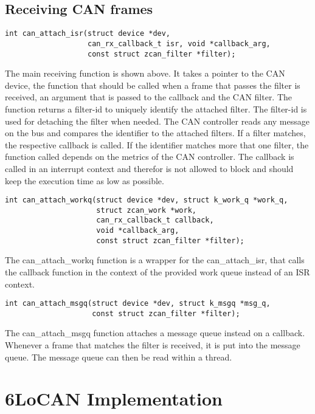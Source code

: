 \subsection{Receiving CAN frames}

\begin{lstlisting}[style=ccode, numbers=none]
int can_attach_isr(struct device *dev,
                   can_rx_callback_t isr, void *callback_arg,
                   const struct zcan_filter *filter);
\end{lstlisting}
The main receiving function is shown above.
It takes a pointer to the CAN device, the function that should be called when a frame that passes the filter is received,
an argument that is passed to the callback and the CAN filter.
The function returns a filter-id to uniquely identify the attached filter.
The filter-id is used for detaching the filter when needed.
The CAN controller reads any message on the bus and compares the identifier to the attached filters.
If a filter matches, the respective callback is called.
If the identifier matches more that one filter, the function called depends on the metrics of the CAN controller.
The callback is called in an interrupt context and therefor is not allowed to block and should keep the execution time as low as possible.

\begin{lstlisting}[style=ccode, numbers=none]
int can_attach_workq(struct device *dev, struct k_work_q *work_q,
                     struct zcan_work *work,
                     can_rx_callback_t callback,
                     void *callback_arg,
                     const struct zcan_filter *filter);
\end{lstlisting}
The can\_attach\_workq function is a wrapper for the can\_attach\_isr,
that calls the callback function in the context of the provided work queue instead of an ISR context.

\begin{lstlisting}[style=ccode, numbers=none]
int can_attach_msgq(struct device *dev, struct k_msgq *msg_q,
                    const struct zcan_filter *filter);
\end{lstlisting}
The can\_attach\_msgq function attaches a message queue instead on a callback.
Whenever a frame that matches the filter is received, it is put into the message queue.
The message queue can then be read within a thread.

\section{6LoCAN Implementation}
\label{sec:6locan_impl}

